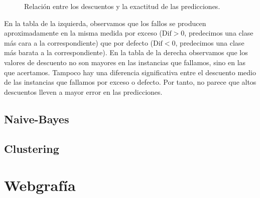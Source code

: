\documentclass{article}
\begin{document}
\begin{figure}[H]
  \centering {}
  \caption{Relación entre los descuentos y la exactitud de las predicciones.}
  \label{fig:descuento}
\end{figure}

En la tabla de la izquierda, observamos que los fallos se producen
aproximadamente en la misma medida por exceso ($\text{Dif}>0$,
predecimos una clase más cara a la correspondiente) que por defecto
($\text{Dif}<0$, predecimos una clase más barata a la
correspondiente). En la tabla de la derecha observamos que los valores
de descuento no son mayores en las instancias que fallamos, sino en
las que acertamos. Tampoco hay una diferencia significativa entre el
descuento medio de las instancias que fallamos por exceso o
defecto. Por tanto, no parece que altos descuentos lleven a mayor
error en las predicciones.

\subsection{Naive-Bayes}

\subsection{Clustering}

\section{Webgrafía}
\end{document}
